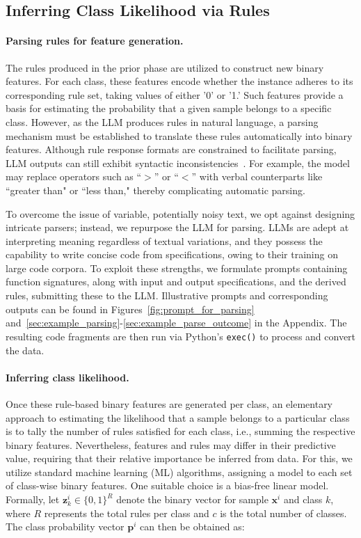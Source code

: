 \subsection{Inferring Class Likelihood via Rules}
\label{Sec:training}

\paragraph{Parsing rules for feature generation.} The rules produced in the prior phase are utilized to construct new binary features. For each class, these features encode whether the instance adheres to its corresponding rule set, taking values of either '0' or '1.' Such features provide a basis for estimating the probability that a given sample belongs to a specific class. However, as the LLM produces rules in natural language, a parsing mechanism must be established to translate these rules automatically into binary features. Although rule response formats are constrained to facilitate parsing, LLM outputs can still exhibit syntactic inconsistencies~\cite{kovavc2023large}. For example, the model may replace operators such as ``$>$” or ``$<$” with verbal counterparts like ``greater than" or ``less than," thereby complicating automatic parsing.

To overcome the issue of variable, potentially noisy text, we opt against designing intricate parsers; instead, we repurpose the LLM for parsing. LLMs are adept at interpreting meaning regardless of textual variations, and they possess the capability to write concise code from specifications, owing to their training on large code corpora. To exploit these strengths, we formulate prompts containing function signatures, along with input and output specifications, and the derived rules, submitting these to the LLM. Illustrative prompts and corresponding outputs can be found in Figures~\ref{fig:prompt_for_parsing} and~\ref{sec:example_parsing}-\ref{sec:example_parse_outcome} in the Appendix. The resulting code fragments are then run via Python's \texttt{exec()} to process and convert the data.

\vspace*{-0.12in}
\paragraph{Inferring class likelihood.} Once these rule-based binary features are generated per class, an elementary approach to estimating the likelihood that a sample belongs to a particular class is to tally the number of rules satisfied for each class, i.e., summing the respective binary features. Nevertheless, features and rules may differ in their predictive value, requiring that their relative importance be inferred from data. For this, we utilize standard machine learning (ML) algorithms, assigning a model to each set of class-wise binary features. One suitable choice is a bias-free linear model. Formally, let $\mathbf{z}_k^i \in \{0, 1\}^R$ denote the binary vector for sample $\mathbf{x}^i$ and class $k$, where $R$ represents the total rules per class and $c$ is the total number of classes. The class probability vector $\mathbf{p}^i$ can then be obtained as:

